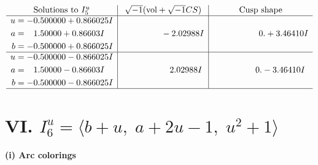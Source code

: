 \documentclass[1p]{elsarticle_modified}
\theoremstyle{definition}
\newcommand{\I}{\sqrt{-1}}
\begin{document}
$$\begin{array}{c|c|c}  
\text{Solutions to }I^u_{5}& \I (\text{vol} + \sqrt{-1}CS) & \text{Cusp shape}\\
 \hline 
\begin{aligned}
u &= -0.500000 + 0.866025 I \\
a &= \phantom{-}1.50000 + 0.86603 I \\
b &= -0.500000 + 0.866025 I\end{aligned}
 & \phantom{-0.000000 } -2.02988 I & \phantom{-0.000000 -}0. + 3.46410 I \\ \hline\begin{aligned}
u &= -0.500000 - 0.866025 I \\
a &= \phantom{-}1.50000 - 0.86603 I \\
b &= -0.500000 - 0.866025 I\end{aligned}
 & \phantom{-0.000000 -}2.02988 I & \phantom{-0.000000 } 0. - 3.46410 I\\
 \hline 
 \end{array}$$\newpage\newpage\renewcommand{\arraystretch}{1}
\centering \section*{VI. $I^u_{6}= \langle b+u,\;a+2 u-1,\;u^2+1 \rangle$}
\flushleft \textbf{(i) Arc colorings}\\
\end{document}

